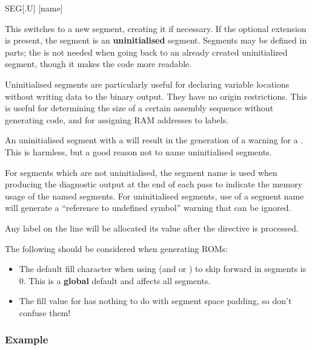 \begin{usage}
  SEG[.U] [name]
\end{usage}

This switches to a new segment, creating it if necessary. If the optional  extension is present, the segment is an \textbf{uninitialised} segment. Segments may be defined in parts; the  is not needed when going back to an already created uninitialized segment, though it makes the code more readable.

Uninitialised segments are particularly useful for declaring variable locations without writing data to the binary output. They have no origin restrictions. This is useful for determining the size of a certain assembly sequence without generating code, and for assigning RAM addresses to labels.

An uninitialised segment with a  will result in the generation of a warning for a . This is harmless, but a good reason not to name uninitialised segments.

For segments which are not uninitialised, the segment name is used when producing the diagnostic output at the end of each pass to indicate the memory usage of the named segments. For uninitialised segments, use of a segment name will generate a ``reference to undefined symbol'' warning that can be ignored.

Any label on the  line will be allocated its value after the directive is processed.

The following should be considered when generating ROMs:

\begin{itemize}
	\item The default fill character when using  (and   or ) to
	skip forward in segments is 0. This is a \textbf{global} default and affects all segments.
	\item The fill value for  has nothing to do with segment space padding, so don't confuse them!
\end{itemize}

\subsubsection{Example}



